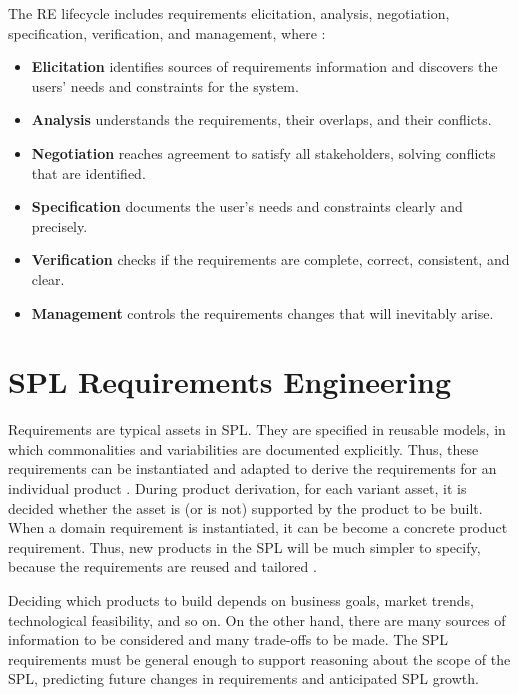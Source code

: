 The \ac{RE} lifecycle includes requirements elicitation, analysis, negotiation, specification, verification, and 
management, where \citep{clements2002software,sommerville2005integrated}:

\begin{itemize}
\item \textbf{Elicitation} identifies sources of requirements information and discovers the 
users’ needs and constraints for the system.
\item \textbf{Analysis} understands the requirements, their overlaps, and their conflicts.
\item \textbf{Negotiation} reaches agreement to satisfy all stakeholders,
solving conflicts that are identified.
\item \textbf{Specification} documents the user’s needs and constraints clearly and precisely.
\item \textbf{Verification} checks if the requirements are complete, correct, consistent, and clear.
\item \textbf{Management} controls the requirements changes that will inevitably arise.
\end{itemize}

\section{SPL Requirements Engineering}
\label{sc:splrequirementsengineering}

Requirements are typical assets in SPL. They are specified in reusable models,
in which commonalities and variabilities are documented explicitly. Thus, these requirements 
can be instantiated and adapted to derive the requirements for an individual
product \citep{cheng2007research}.
During product derivation, for each variant asset, it is decided whether the asset is (or is not) supported by 
the product to be built. When a domain requirement is instantiated, it can be become a concrete product requirement. 
Thus, new products in the SPL will be much simpler to specify, because the requirements are reused and tailored 
\citep{clements2002software}. 

Deciding which products to build depends on business goals, market trends,
technological feasibility, and so on. On the other hand, there are many sources of information 
to be considered and many trade-offs to be made. The SPL requirements must be general enough to support 
reasoning about the scope of the SPL, predicting future changes in requirements and anticipated SPL growth. 

